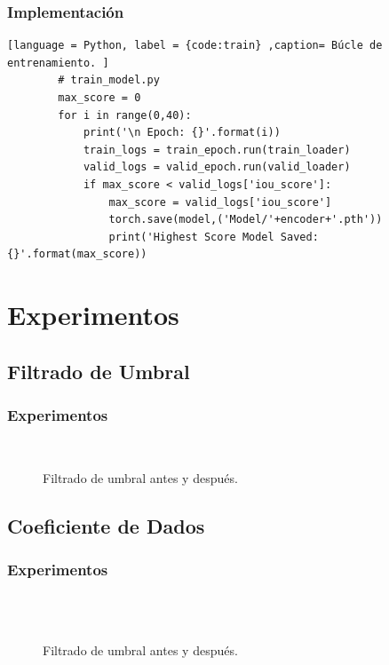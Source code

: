 \documentclass{beamer}
\begin{document}
\begin{frame}[fragile]
    \frametitle{Implementación}
    \begin{lstlisting}[language = Python, label = {code:train} ,caption= Búcle de entrenamiento. ]
        # train_model.py
        max_score = 0 
        for i in range(0,40):
            print('\n Epoch: {}'.format(i))
            train_logs = train_epoch.run(train_loader)
            valid_logs = valid_epoch.run(valid_loader)
            if max_score < valid_logs['iou_score']:
                max_score = valid_logs['iou_score']
                torch.save(model,('Model/'+encoder+'.pth'))
                print('Highest Score Model Saved: {}'.format(max_score))
    \end{lstlisting}
\end{frame}

\section{Experimentos}

\subsection{Filtrado de Umbral}
\begin{frame}
    \frametitle{Experimentos}
    \begin{figure}
         \qquad
         \\
         \qquad
        \caption{Filtrado de umbral antes y después.}
    \end{figure}
\end{frame}

\subsection{Coeficiente de Dados}
\begin{frame}
    \frametitle{Experimentos}
    \begin{figure}
         \qquad
         \qquad
         \\
         \qquad
         \qquad
         \\
        \caption{Filtrado de umbral antes y después.}
    \end{figure}
\end{frame}
\end{document}
